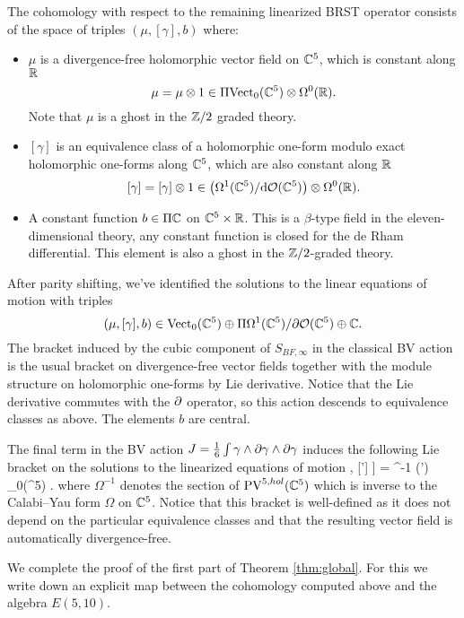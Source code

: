 The cohomology with respect to the remaining linearized BRST operator consists of the space of triples $(\mu, [\gamma], b)$ where:
\begin{itemize}
\item $\mu$ is a divergence-free holomorphic vector field on $\mathbb C^5$, which is constant along $\mathbb R$
\[
\mu = \mu \otimes 1 \in \Pi {\rm Vect}_0(\mathbb C^5) \otimes \Omega^0(\mathbb R) .
\]
Note that $\mu$ is a ghost in the $\mathbb Z/2$ graded theory. 
\item $[\gamma]$ is an equivalence class of a holomorphic one-form modulo exact holomorphic one-forms along $\mathbb C^5$, which are also constant along $\mathbb R$
\[
[\gamma] = [\gamma] \otimes 1 \in \left(\Omega^{1}(\mathbb C^5) / {\rm d} \mathcal O(\mathbb C^5) \right) \otimes \Omega^0(\mathbb R) .
\]
\item A constant function $b \in \Pi \mathbb C$ on $\mathbb C^5 \times \mathbb R$.
This is a $\beta$-type field in the eleven-dimensional theory, any constant function is closed for the de Rham differential. 
This element is also a ghost in the $\mathbb Z/2$-graded theory. 
\end{itemize}

\parsec[]

After parity shifting, we've identified the solutions to the linear equations of motion with triples
\[
(\mu, [\gamma], b) \in {\rm Vect}_0(\mathbb C^5) \oplus \Pi \Omega^{1}(\mathbb C^5) / \partial \mathcal O(\mathbb C^5) \oplus \mathbb C .
\]
The bracket induced by the cubic component of $S_{BF, \infty}$ in the classical BV action is the usual bracket on divergence-free vector fields together with the module structure on holomorphic one-forms by Lie derivative.
Notice that the Lie derivative commutes with the $\partial$ operator, so this action descends to equivalence classes as above. 
The elements $b$ are central. 

The final term in the BV action $J = \frac16\int \gamma \wedge \partial \gamma \wedge \partial \gamma$ induces the following Lie bracket on the solutions to the linearized equations of motion
\beqn\label{eqn:eqb}
\big[[\gamma], [\gamma'] \big] = \Omega^{-1} \vee (\del \gamma \wedge \del \gamma') \in \Vect_0(\CC^5) .
\eeqn
where $\Omega^{-1}$ denotes the section of ${\rm PV}^{5,hol}(\mathbb C^5)$ which is inverse to the Calabi--Yau form $\Omega$ on $\mathbb C^5$. 
Notice that this bracket is well-defined as it does not depend on the particular equivalence classes and that the resulting vector field is automatically divergence-free.

\parsec[]

We complete the proof of the first part of Theorem \ref{thm:global}. 
For this we write down an explicit map between the cohomology computed above and the algebra $E(5,10)$. 

